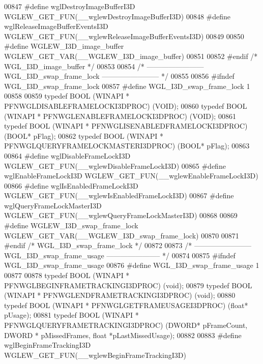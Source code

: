 \begin{DoxyCode}
00847 \textcolor{preprocessor}{#define wglDestroyImageBufferI3D WGLEW\_GET\_FUN(\_\_wglewDestroyImageBufferI3D)}
00848 \textcolor{preprocessor}{#define wglReleaseImageBufferEventsI3D WGLEW\_GET\_FUN(\_\_wglewReleaseImageBufferEventsI3D)}
00849 
00850 \textcolor{preprocessor}{#define WGLEW\_I3D\_image\_buffer WGLEW\_GET\_VAR(\_\_WGLEW\_I3D\_image\_buffer)}
00851 
00852 \textcolor{preprocessor}{#endif }\textcolor{comment}{/* WGL\_I3D\_image\_buffer */}\textcolor{preprocessor}{}
00853 
00854 \textcolor{comment}{/* ------------------------ WGL\_I3D\_swap\_frame\_lock ------------------------ */}
00855 
00856 \textcolor{preprocessor}{#ifndef WGL\_I3D\_swap\_frame\_lock}
00857 \textcolor{preprocessor}{#define WGL\_I3D\_swap\_frame\_lock 1}
00858 
00859 \textcolor{keyword}{typedef} BOOL (WINAPI * PFNWGLDISABLEFRAMELOCKI3DPROC) (VOID);
00860 \textcolor{keyword}{typedef} BOOL (WINAPI * PFNWGLENABLEFRAMELOCKI3DPROC) (VOID);
00861 \textcolor{keyword}{typedef} BOOL (WINAPI * PFNWGLISENABLEDFRAMELOCKI3DPROC) (BOOL* pFlag);
00862 \textcolor{keyword}{typedef} BOOL (WINAPI * PFNWGLQUERYFRAMELOCKMASTERI3DPROC) (BOOL* pFlag);
00863 
00864 \textcolor{preprocessor}{#define wglDisableFrameLockI3D WGLEW\_GET\_FUN(\_\_wglewDisableFrameLockI3D)}
00865 \textcolor{preprocessor}{#define wglEnableFrameLockI3D WGLEW\_GET\_FUN(\_\_wglewEnableFrameLockI3D)}
00866 \textcolor{preprocessor}{#define wglIsEnabledFrameLockI3D WGLEW\_GET\_FUN(\_\_wglewIsEnabledFrameLockI3D)}
00867 \textcolor{preprocessor}{#define wglQueryFrameLockMasterI3D WGLEW\_GET\_FUN(\_\_wglewQueryFrameLockMasterI3D)}
00868 
00869 \textcolor{preprocessor}{#define WGLEW\_I3D\_swap\_frame\_lock WGLEW\_GET\_VAR(\_\_WGLEW\_I3D\_swap\_frame\_lock)}
00870 
00871 \textcolor{preprocessor}{#endif }\textcolor{comment}{/* WGL\_I3D\_swap\_frame\_lock */}\textcolor{preprocessor}{}
00872 
00873 \textcolor{comment}{/* ------------------------ WGL\_I3D\_swap\_frame\_usage ----------------------- */}
00874 
00875 \textcolor{preprocessor}{#ifndef WGL\_I3D\_swap\_frame\_usage}
00876 \textcolor{preprocessor}{#define WGL\_I3D\_swap\_frame\_usage 1}
00877 
00878 \textcolor{keyword}{typedef} BOOL (WINAPI * PFNWGLBEGINFRAMETRACKINGI3DPROC) (void);
00879 \textcolor{keyword}{typedef} BOOL (WINAPI * PFNWGLENDFRAMETRACKINGI3DPROC) (void);
00880 \textcolor{keyword}{typedef} BOOL (WINAPI * PFNWGLGETFRAMEUSAGEI3DPROC) (\textcolor{keywordtype}{float}* pUsage);
00881 \textcolor{keyword}{typedef} BOOL (WINAPI * PFNWGLQUERYFRAMETRACKINGI3DPROC) (DWORD* pFrameCount, DWORD *
      pMissedFrames, \textcolor{keywordtype}{float} *pLastMissedUsage);
00882 
00883 \textcolor{preprocessor}{#define wglBeginFrameTrackingI3D WGLEW\_GET\_FUN(\_\_wglewBeginFrameTrackingI3D)}

\end{DoxyCode}

